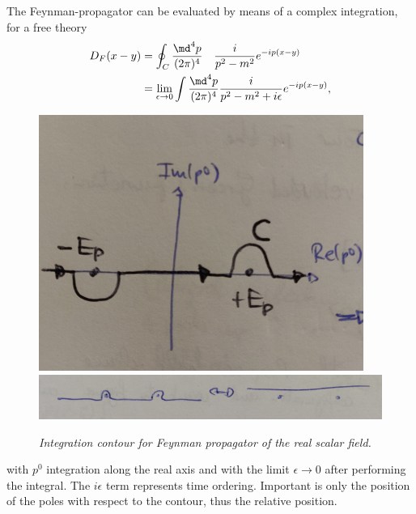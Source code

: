 The Feynman-propagator can be evaluated by means of a complex integration, for a free theory
\begin{align}
	D_F(x-y) &= \oint_C \frac{\md^4p}{(2 \pi)^4} \quad \frac{i}{p^2-m^2} e^{-i p(x-y)}\\
	&=\lim_{\epsilon \rightarrow 0} \int \frac{\md^4p}{(2 \pi)^4} \frac{i}{p^2-m^2+i\epsilon} e^{-ip(x-y)},
\end{align}
\begin{figure}
	\centering
	\includegraphics[width=0.3\linewidth]{gfx/Contour1}
	\includegraphics[width=0.7\linewidth]{gfx/Contour2}
	\caption{\itshape Integration contour for Feynman propagator of the real scalar field.}
	\label{fig:contour1}
\end{figure}
with $p^0$ integration along the real axis and with the limit $\epsilon \rightarrow 0$ after performing the integral.
The $i\epsilon$ term represents time ordering. Important is only the position of the poles with respect to the contour, thus the relative position.

